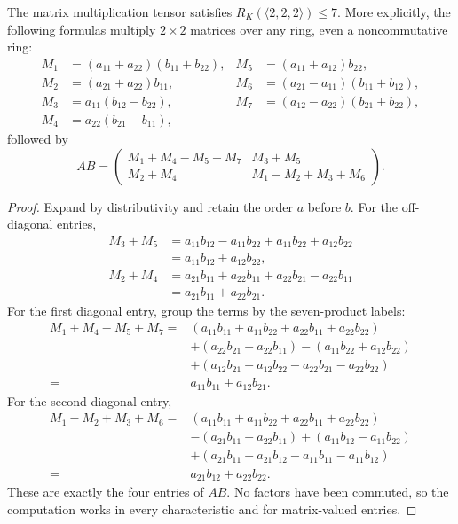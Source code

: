 \begin{theorem}[Strassen, 1969]\label{linear:thm:strassen}
The matrix multiplication tensor satisfies $R_K(\langle2,2,2\rangle)\le7$. More explicitly, the following formulas multiply $2\times2$ matrices over any ring, even a noncommutative ring:
\[
\begin{aligned}
M_1&=(a_{11}+a_{22})(b_{11}+b_{22}),&M_5&=(a_{11}+a_{12})b_{22},\\
M_2&=(a_{21}+a_{22})b_{11},&M_6&=(a_{21}-a_{11})(b_{11}+b_{12}),\\
M_3&=a_{11}(b_{12}-b_{22}),&M_7&=(a_{12}-a_{22})(b_{21}+b_{22}),\\
M_4&=a_{22}(b_{21}-b_{11}),
\end{aligned}
\]
followed by
\[
AB=\begin{pmatrix}
M_1+M_4-M_5+M_7&M_3+M_5\\
M_2+M_4&M_1-M_2+M_3+M_6
\end{pmatrix}.
\]
\end{theorem}
\begin{proof}
Expand by distributivity and retain the order $a$ before $b$. For the off-diagonal entries,
\[
\begin{aligned}
M_3+M_5
 &=a_{11}b_{12}-a_{11}b_{22}+a_{11}b_{22}+a_{12}b_{22}\\
 &=a_{11}b_{12}+a_{12}b_{22},\\
M_2+M_4
 &=a_{21}b_{11}+a_{22}b_{11}+a_{22}b_{21}-a_{22}b_{11}\\
 &=a_{21}b_{11}+a_{22}b_{21}.
\end{aligned}
\]
For the first diagonal entry, group the terms by the seven-product labels:
\[
\begin{aligned}
M_1+M_4-M_5+M_7
={}&(a_{11}b_{11}+a_{11}b_{22}+a_{22}b_{11}+a_{22}b_{22})\\
 &+(a_{22}b_{21}-a_{22}b_{11})
 -(a_{11}b_{22}+a_{12}b_{22})\\
 &+(a_{12}b_{21}+a_{12}b_{22}-a_{22}b_{21}-a_{22}b_{22})\\
={}&a_{11}b_{11}+a_{12}b_{21}.
\end{aligned}
\]
For the second diagonal entry,
\[
\begin{aligned}
M_1-M_2+M_3+M_6
={}&(a_{11}b_{11}+a_{11}b_{22}+a_{22}b_{11}+a_{22}b_{22})\\
 &-(a_{21}b_{11}+a_{22}b_{11})
 +(a_{11}b_{12}-a_{11}b_{22})\\
 &+(a_{21}b_{11}+a_{21}b_{12}-a_{11}b_{11}-a_{11}b_{12})\\
={}&a_{21}b_{12}+a_{22}b_{22}.
\end{aligned}
\]
These are exactly the four entries of $AB$. No factors have been commuted, so the computation works in every characteristic and for matrix-valued entries.
\end{proof}

